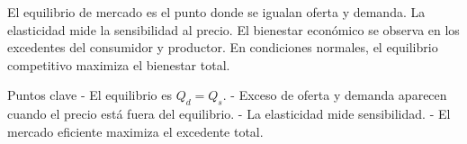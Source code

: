 El equilibrio de mercado es el punto donde se igualan oferta y demanda. La elasticidad mide la sensibilidad al precio. El bienestar económico se observa en los excedentes del consumidor y productor. En condiciones normales, el equilibrio competitivo maximiza el bienestar total.

\begin{resumen}{Puntos clave}
- El equilibrio es $Q_d = Q_s$.
- Exceso de oferta y demanda aparecen cuando el precio está fuera del equilibrio.
- La elasticidad mide sensibilidad.
- El mercado eficiente maximiza el excedente total.
\end{resumen}
